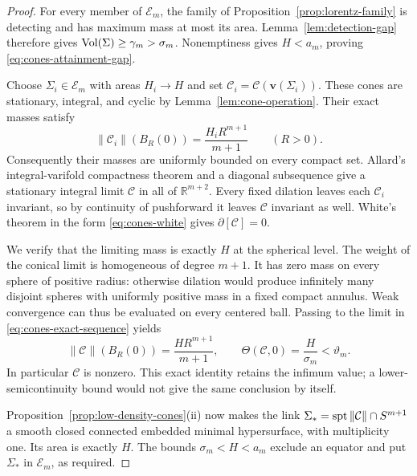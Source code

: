 \begin{proof}
For every member of $\mathcal E_m$, the family of
Proposition~\ref{prop:lorentz-family} is detecting and has maximum
mass at most its area.  Lemma~\ref{lem:detection-gap} therefore
gives $\operatorname{Vol}(\Sigma)\geq\gamma_m>\sigma_m$.
Nonemptiness gives $H<a_m$, proving
\eqref{eq:cones-attainment-gap}.

Choose $\Sigma_i\in\mathcal E_m$ with areas $H_i\to H$ and set
$\mathcal C_i=\mathcal C(\mathbf v(\Sigma_i))$.
These cones are stationary, integral, and cyclic by
Lemma~\ref{lem:cone-operation}.  Their exact masses satisfy
\begin{equation}\label{eq:cones-exact-sequence}
 \|\mathcal C_i\|(B_R(0))=\frac{H_iR^{m+1}}{m+1}
 \qquad(R>0).
\end{equation}
Consequently their masses are uniformly bounded on every compact
set.  Allard's integral-varifold compactness theorem and a
diagonal subsequence give a stationary integral limit
$\mathcal C$ in all of $\mathbb R^{m+2}$.
Every fixed dilation leaves each $\mathcal C_i$ invariant, so by
continuity of pushforward it leaves $\mathcal C$ invariant as well.
White's theorem in the form \eqref{eq:cones-white} gives
$\partial[\mathcal C]=0$.

We verify that the limiting mass is exactly $H$ at the spherical
level.  The weight of the conical limit is homogeneous of degree
$m+1$.  It has zero mass on every sphere of positive radius:
otherwise dilation would produce infinitely many disjoint spheres
with uniformly positive mass in a fixed compact annulus.
Weak convergence can thus be evaluated on every centered ball.
Passing to the limit in \eqref{eq:cones-exact-sequence} yields
\[
 \|\mathcal C\|(B_R(0))=\frac{HR^{m+1}}{m+1},
 \qquad
 \Theta(\mathcal C,0)=\frac H{\sigma_m}<\vartheta_m.
\]
In particular $\mathcal C$ is nonzero.  This exact identity
retains the infimum value; a lower-semicontinuity bound would not
give the same conclusion by itself.

Proposition~\ref{prop:low-density-cones}(ii) now makes the link
$\Sigma_*=\operatorname{spt}\|\mathcal C\|\cap S^{m+1}$ a smooth closed
connected embedded minimal hypersurface, with multiplicity one.
Its area is exactly $H$.  The bounds
$\sigma_m<H<a_m$ exclude an equator and put $\Sigma_*$ in
$\mathcal E_m$, as required.
\end{proof}
